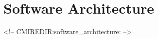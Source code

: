 
\chapter{Software Architecture}
\label{chap:sarch}
\begin{rawhtml}
<!-- CMIREDIR:software_architecture: -->
\end{rawhtml}


